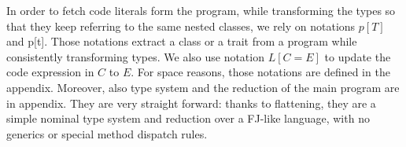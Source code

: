 
In order to fetch code literals form the program, while transforming the types so that they keep referring to the same nested classes, we rely on notations
$p[T]$ and p[t].
Those notations extract a class or a trait from a program while consistently transforming types.
We also use notation $L[C=E]$ to update the code expression in $C$ to $E$.
For space reasons, those notations are defined in the appendix.
Moreover, also  type system and the reduction of the main program are in appendix. They are very straight forward: thanks to flattening, they are a simple nominal type system and reduction over a FJ-like language, with no generics or special method dispatch rules.




\begin{comment}
Define operations on p
--------------------------------------
p.evilPush(L) = (C = L, p)
	for fresh C

p.push(id) = (id = L, p)
    p = (id' = {_;_, id = L, _ ;_}, _; Ds)

(id = L, p).pop() = p
(id = L, p).top() = L

Define equivy ops...
------------------------------
empty =p empty
P, Ps =p P', Ps' iff:
	p.minimize(P) = p.minimize(P')
	Ps =p Ps'

Pz subseteq_p Pz' iff:
	p.minimize(Pz) subseteq p.minimize(Pz')

p.minimize(empty) = empty
p.minimize(P, Pz) = p.minimize(P), p.minimize(Pz)

p.minimize(Thisn+1.idn.Cs) = p.minimize(Thisn.Cs):
  p = id0 = L0, ..., idn = Ln, _; Ds
  p(Thisn.Cs) = L
  // TODO: Check that Ln is an LV instead?

otherwise p.minimize(P) = P

define dom(Mz) = Midz
===========================================
dom(empty) = empty
dom(C = E, Mz) = C, dom(Mz)
dom(T m(Txs), Mz) = m, dom(Mz)
\end{comment}

